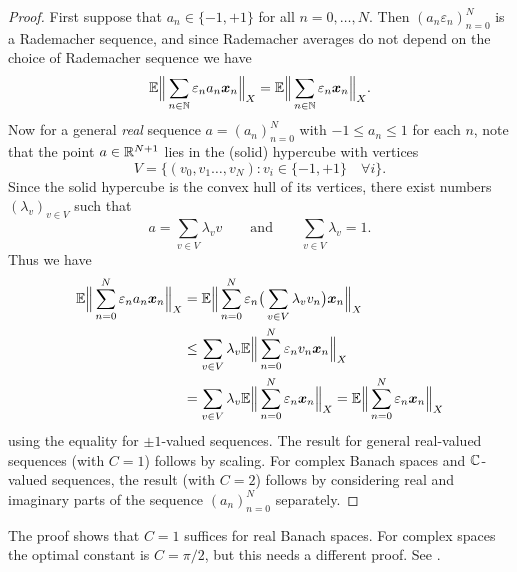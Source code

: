 \begin{proof}
  First suppose that $a_n \in \{-1,+1\}$ for all $n = 0, \ldots, N$.
  Then $(a_n \varepsilon_{n})_{n=0}^{N}$ is a Rademacher sequence, and since Rademacher averages do not depend on the choice of Rademacher sequence we have
  \begin{equation*}
    \mathbb{E} \Big\| \sum_{n \in \mathbb{N}} \varepsilon_{n} a_{n} \bm{x}_{n} \Big\|_{X} = \mathbb{E} \Big\| \sum_{n \in \mathbb{N}} \varepsilon_{n} \bm{x}_{n} \Big\|_{X}.
  \end{equation*}
  Now for a general \emph{real} sequence $a = (a_n)_{n=0}^{N}$ with $-1 \leq a_n \leq 1$ for each $n$, note that the point $a \in \mathbb{R}^{N+1}$ lies in the (solid) hypercube with vertices
  \begin{equation*}
    V = \{(v_{0}, v_{1}\ldots, v_{N}) : v_{i} \in \{-1,+1\} \quad \forall i\}.
  \end{equation*}
  Since the solid hypercube is the convex hull of its vertices, there exist numbers $(\lambda_{v})_{v \in V}$ such that
  \begin{equation*}
    a = \sum_{v \in V} \lambda_{v} v \qquad \text{and} \qquad \sum_{v \in V} \lambda_{v} = 1.
  \end{equation*}
  Thus we have
  \begin{equation*}
    \begin{aligned}
    \mathbb{E} \Big\| \sum_{n = 0}^{N} \varepsilon_{n} a_{n} \bm{x}_{n} \Big\|_{X}
    &= \mathbb{E} \Big\| \sum_{n = 0}^{N} \varepsilon_{n} \big( \sum_{v \in V} \lambda_{v} v_{n} \big) \bm{x}_{n} \Big\|_{X} \\
    &\leq \sum_{v \in V} \lambda_{v} \mathbb{E} \Big\| \sum_{n = 0}^{N} \varepsilon_{n} v_{n} \bm{x}_{n} \Big\|_{X} \\
    &= \sum_{v \in V} \lambda_{v} \mathbb{E} \Big\| \sum_{n = 0}^{N} \varepsilon_{n} \bm{x}_{n} \Big\|_{X} 
    = \mathbb{E} \Big\| \sum_{n = 0}^{N} \varepsilon_{n} \bm{x}_{n} \Big\|_{X}
  \end{aligned}
\end{equation*}
using the equality for $\pm 1$-valued sequences.
The result for general real-valued sequences (with $C=1$) follows by scaling.
For complex Banach spaces and $\mathbb{C}$-valued sequences, the result (with $C=2$) follows by considering real and imaginary parts of the sequence $(a_n)_{n = 0}^{N}$ separately. 
\end{proof}

\begin{rmk}
  The proof shows that $C = 1$ suffices for real Banach spaces.
  For complex spaces the optimal constant is $C = \pi/2$, but this needs a different proof.
  See \cite[Proposition 3.2.10]{HNVW16}.
\end{rmk}


